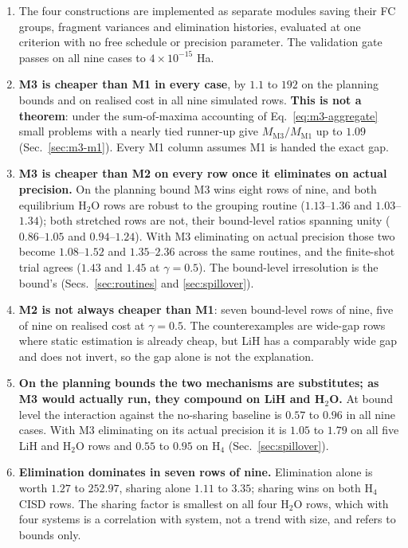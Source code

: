 \documentclass[10pt]{article}
\begin{document}
\begin{enumerate}[leftmargin=2em]
  \item The four constructions are implemented as separate modules saving their FC groups, fragment variances and elimination histories, evaluated at one criterion with no free schedule or precision parameter. The validation gate passes on all nine cases to $4\times10^{-15}$ Ha.
  \item \textbf{M3 is cheaper than M1 in every case}, by $1.1$ to $192$ on the planning bounds and on realised cost in all nine simulated rows. \textbf{This is not a theorem}: under the sum-of-maxima accounting of Eq.~\eqref{eq:m3-aggregate} small problems with a nearly tied runner-up give $M_{\mathrm{M3}}/M_{\mathrm{M1}}$ up to $1.09$ (Sec.~\ref{sec:m3-m1}). Every M1 column assumes M1 is handed the exact gap.
  \item \textbf{M3 is cheaper than M2 on every row once it eliminates on actual precision.} On the planning bound M3 wins eight rows of nine, and both equilibrium H$_2$O rows are robust to the grouping routine ($1.13$--$1.36$ and $1.03$--$1.34$); both stretched rows are not, their bound-level ratios spanning unity ($0.86$--$1.05$ and $0.94$--$1.24$). With M3 eliminating on actual precision those two become $1.08$--$1.52$ and $1.35$--$2.36$ across the same routines, and the finite-shot trial agrees ($1.43$ and $1.45$ at $\gamma=0.5$). The bound-level irresolution is the bound's (Secs.~\ref{sec:routines} and \ref{sec:spillover}).
  \item \textbf{M2 is not always cheaper than M1}: seven bound-level rows of nine, five of nine on realised cost at $\gamma=0.5$. The counterexamples are wide-gap rows where static estimation is already cheap, but LiH has a comparably wide gap and does not invert, so the gap alone is not the explanation.
  \item \textbf{On the planning bounds the two mechanisms are substitutes; as M3 would actually run, they compound on LiH and H$_2$O.} At bound level the interaction against the no-sharing baseline is $0.57$ to $0.96$ in all nine cases. With M3 eliminating on its actual precision it is $1.05$ to $1.79$ on all five LiH and H$_2$O rows and $0.55$ to $0.95$ on H$_4$ (Sec.~\ref{sec:spillover}).
  \item \textbf{Elimination dominates in seven rows of nine.} Elimination alone is worth $1.27$ to $252.97$, sharing alone $1.11$ to $3.35$; sharing wins on both H$_4$ CISD rows. The sharing factor is smallest on all four H$_2$O rows, which with four systems is a correlation with system, not a trend with size, and refers to bounds only.

\end{enumerate}
\end{document}
